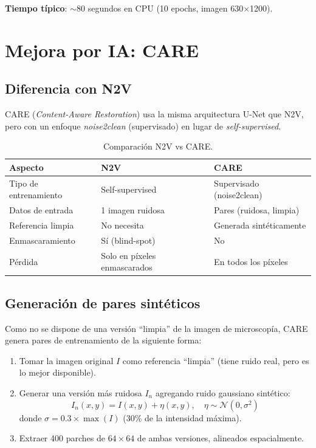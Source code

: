 \documentclass[11pt,a4paper]{article}
\begin{document}
\textbf{Tiempo t\'{i}pico}: $\sim$80 segundos en CPU (10 epochs, imagen 630$\times$1200).

\section{Mejora por IA: CARE}
\label{sec:care}

\subsection{Diferencia con N2V}

CARE (\textit{Content-Aware Restoration}) usa la misma arquitectura U-Net que N2V, pero con un enfoque \textit{noise2clean} (supervisado) en lugar de \textit{self-supervised}.

\begin{table}[H]
\centering
\begin{tabular}{lll}
\toprule
\textbf{Aspecto} & \textbf{N2V} & \textbf{CARE} \\
\midrule
Tipo de entrenamiento & Self-supervised & Supervisado (noise2clean) \\
Datos de entrada & 1 imagen ruidosa & Pares (ruidosa, limpia) \\
Referencia limpia & No necesita & Generada sint\'{e}ticamente \\
Enmascaramiento & S\'{i} (blind-spot) & No \\
P\'{e}rdida & Solo en p\'{i}xeles enmascarados & En todos los p\'{i}xeles \\
\bottomrule
\end{tabular}
\caption{Comparaci\'{o}n N2V vs CARE.}
\end{table}

\subsection{Generaci\'{o}n de pares sint\'{e}ticos}

Como no se dispone de una versi\'{o}n ``limpia'' de la imagen de microscop\'{i}a, CARE genera pares de entrenamiento de la siguiente forma:

\begin{enumerate}
  \item Tomar la imagen original $I$ como referencia ``limpia'' (tiene ruido real, pero es lo mejor disponible).
  \item Generar una versi\'{o}n m\'{a}s ruidosa $I_n$ agregando ruido gaussiano sint\'{e}tico:
  \begin{equation}
    I_n(x, y) = I(x, y) + \eta(x, y), \quad \eta \sim \mathcal{N}(0, \sigma^2)
  \end{equation}
  donde $\sigma = 0.3 \times \max(I)$ (30\% de la intensidad m\'{a}xima).
  \item Extraer 400 parches de $64 \times 64$ de ambas versiones, alineados espacialmente.
\end{enumerate}
\end{document}
